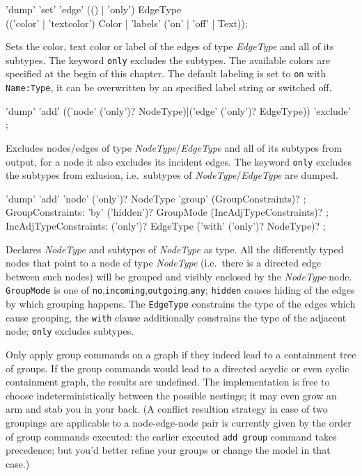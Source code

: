 \begin{rail}
  'dump' 'set' 'edge' (() | 'only') EdgeType \\ (('color' | 'textcolor') Color | 'labels' ('on' | 'off' | Text));
\end{rail}
Sets the color, text color or label of the edges of type \emph{EdgeType} and all of its subtypes.
The keyword \texttt{only} excludes the subtypes. The available colors are specified at the begin of this chapter.
The default labeling is set to \texttt{on} with \texttt{Name:Type}, it can be overwritten by an specified label string or switched off.

\begin{rail}
  'dump' 'add' (('node' ('only')? NodeType)|('edge' ('only')? EdgeType)) 'exclude' ;
\end{rail}
Excludes nodes/edges of type \emph{NodeType}/\emph{EdgeType} and all of its subtypes from output, for a node it also excludes its incident edges.
The keyword \texttt{only} excludes the subtypes from exlusion, i.e.\ subtypes of \emph{NodeType}/\emph{EdgeType} are dumped.

\begin{rail}
  'dump' 'add' 'node' ('only')? NodeType 'group' (GroupConstraints)? ;
GroupConstraints:
  'by' ('hidden')? GroupMode (IncAdjTypeConstraints)? ;
IncAdjTypeConstraints:
  ('only')? EdgeType ('with' ('only')? NodeType)? ;
\end{rail}
Declares \emph{NodeType} and subtypes of \emph{NodeType} as  type.
All the differently typed nodes that point to a node of type \emph{NodeType} 
(i.e.\ there is a directed edge between such nodes) will be grouped and visibly enclosed by the \emph{NodeType}-node.
\texttt{GroupMode} is one of \texttt{no},\texttt{incoming},\texttt{outgoing},\texttt{any}; \texttt{hidden} causes hiding of the edges by which grouping happens.
The \texttt{EdgeType} constrains the type of the edges which cause grouping, the \texttt{with} clause additionally constrains the type of the adjacent node; 
\texttt{only} excludes subtypes.

\begin{note}
Only apply group commands on a graph if they indeed lead to a containment tree of groups.
If the group commands would lead to a directed acyclic or even cyclic containment graph, the results are undefined.
The implementation is free to choose indeterministically between the possible nestings; it may even grow an arm and stab you in your back.
(A conflict resultion strategy in case of two groupings are applicable to a node-edge-node pair is currently given by the order of group commands executed:
the earlier executed \texttt{add group} command takes precedence; but you'd better refine your groups or change the model in that case.)
\end{note}

